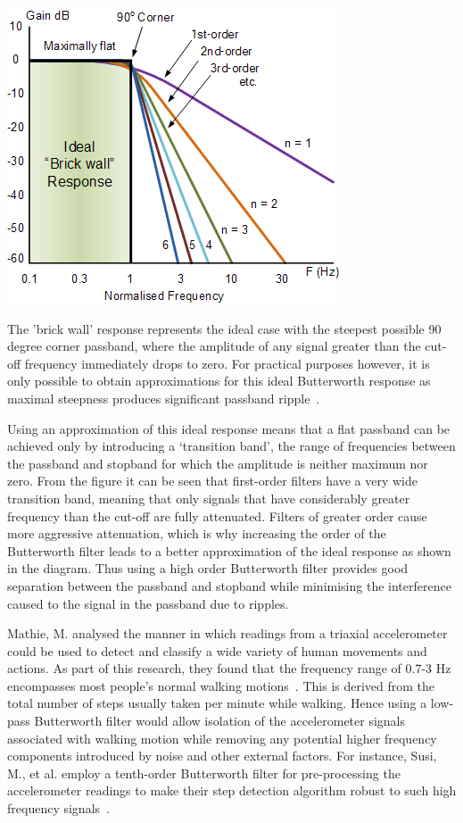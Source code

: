\documentclass[12pt,a4paper,notitlepage]{report}
\begin{document}
\begin{center}
\includegraphics[scale=0.9]{images/butterworthResponse.png}
\label{fig:butterworthResponse}
\end{center}
The 'brick wall' response represents the ideal case with the steepest possible 90 degree corner passband, where the amplitude of any signal greater than the cut-off frequency immediately drops to zero. For practical purposes however, it is only possible to obtain approximations for this ideal Butterworth response as maximal steepness produces significant passband ripple~\cite{butterworthResponse}. 

Using an approximation of this ideal response means that a flat passband can be achieved only by introducing a `transition band', the range of frequencies between the passband and stopband for which the amplitude is neither maximum nor zero. From the figure it can be seen that first-order filters have a very wide transition band, meaning that only signals that have considerably greater frequency than the cut-off are fully attenuated. Filters of greater order cause more aggressive attenuation, which is why increasing the order of the Butterworth filter leads to a better approximation of the ideal response as shown in the diagram. Thus using a high order Butterworth filter provides good separation between the passband and stopband while minimising the interference caused to the signal in the passband due to ripples.    

Mathie, M. analysed the manner in which readings from a triaxial accelerometer could be used to detect and classify a wide variety of human movements and actions. As part of this research, they found that the frequency range of 0.7-3 Hz encompasses most people's normal walking motions~\cite[p.248]{walkingFrequency}. This is derived from the total number of steps usually taken per minute while walking. Hence using a low-pass Butterworth filter would allow isolation of the accelerometer signals associated with walking motion while removing any potential higher frequency components introduced by noise and other external factors. For instance, Susi, M., et al. employ a tenth-order Butterworth filter for pre-processing the accelerometer readings to make their step detection algorithm robust to such high frequency signals~\cite[p.1552]{susi2013motion}.  
\end{document}

